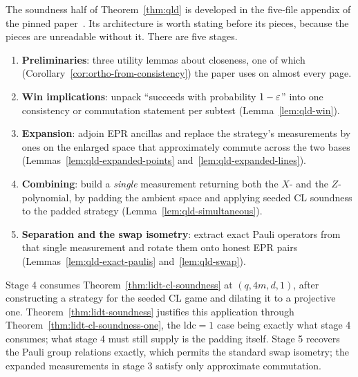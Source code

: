 \begin{remark}
\label{rem:qld-architecture}
The soundness half of Theorem~\ref{thm:qld} is developed in the five-file appendix of
the pinned paper~\cite{AuditSync26}. Its
architecture is worth stating before its pieces, because the pieces are unreadable without it.
There are five stages.
\begin{enumerate}
\item \textbf{Preliminaries}: three utility lemmas about closeness, one of which
  (Corollary~\ref{cor:ortho-from-consistency}) the paper uses on almost every page.
\item \textbf{Win implications}: unpack ``succeeds with probability $1 - \varepsilon$'' into one
  consistency or commutation statement per subtest (Lemma~\ref{lem:qld-win}).
\item \textbf{Expansion}: adjoin EPR ancillas and replace the strategy's measurements by ones
  on the enlarged space that approximately commute across the two bases
  (Lemmas~\ref{lem:qld-expanded-points} and~\ref{lem:qld-expanded-lines}).
\item \textbf{Combining}: build a \emph{single} measurement returning both the $X$- and the
  $Z$-polynomial, by padding the ambient space and applying seeded CL soundness to
  the padded strategy (Lemma~\ref{lem:qld-simultaneous}).
\item \textbf{Separation and the swap isometry}: extract exact Pauli operators from that
  single measurement and rotate them onto honest EPR pairs
  (Lemmas~\ref{lem:qld-exact-paulis} and~\ref{lem:qld-swap}).
\end{enumerate}
Stage 4 consumes Theorem~\ref{thm:lidt-cl-soundness} at $(q,4m,d,1)$, after
constructing a strategy for the seeded CL game and dilating it to a projective one.
Theorem~\ref{thm:lidt-soundness} justifies this application through
Theorem~\ref{thm:lidt-cl-soundness-one}, the $\mathrm{ldc}=1$ case being exactly what stage 4
consumes; what stage 4 must still supply is the padding itself. Stage 5 recovers the Pauli group
relations exactly, which permits the standard swap isometry; the expanded
measurements in stage 3 satisfy only approximate commutation.


\end{remark}
